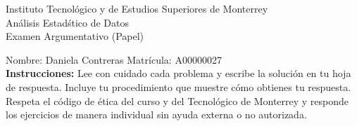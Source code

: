 \documentclass[10pt]{report}
\begin{document}
\newpage



\begin{center}
{\large Instituto Tecnol\'{o}gico y de Estudios Superiores de Monterrey \\
An\'alisis Estad\'stico de Datos } \\
Examen Argumentativo (Papel)
\end{center}

Nombre: \underline{\hspace*{.2in}}
Daniela Contreras
\underline{\hspace*{.2in}} \quad Matr\'icula:\underline{\hspace*{.2in}}
A00000027
\underline{\hspace*{.2in}} \\

{\bf Instrucciones:} Lee con cuidado cada problema y escribe la soluci\'on
en tu hoja de respuesta. Incluye tu procedimiento que muestre c\'omo obtienes tu respuesta.  Respeta el c\'odigo de \'etica del curso y del Tecnol\'ogico de Monterrey y responde los ejercicios de manera individual sin ayuda externa o no autorizada.
\end{document}
